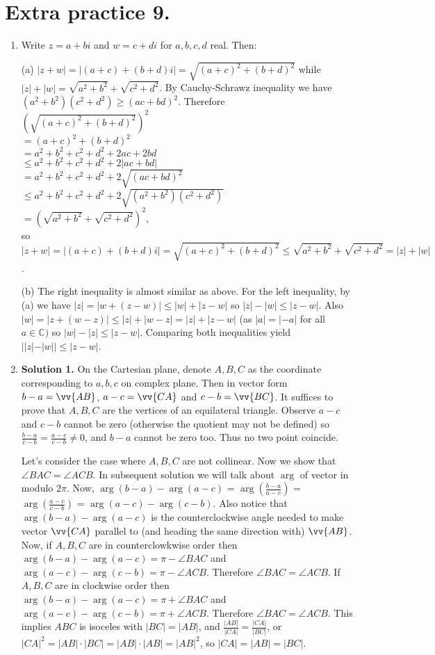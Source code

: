 \documentclass[11pt]{article}
\begin{document}
\section {Extra practice 9.}
\begin{enumerate}
\item Write $z=a+bi$ and $w=c+di$ for $a,b,c,d$ real. Then:

(a) $|z+w|=|(a+c)+(b+d)i|=\sqrt{(a+c)^2+(b+d)^2}$ while $|z|+|w|=\sqrt{a^2+b^2}+\sqrt{c^2+d^2}$. By Cauchy-Schrawz inequality we have $(a^2+b^2)(c^2+d^2)\ge (ac+bd)^2$. Therefore\\ 
$(\sqrt{(a+c)^2+(b+d)^2})^2$\\
$=(a+c)^2+(b+d)^2$\\
$=a^2+b^2+c^2+d^2+2ac+2bd$\\
$\le a^2+b^2+c^2+d^2+2|ac+bd|$\\
$= a^2+b^2+c^2+d^2+2\sqrt{(ac+bd)^2}$\\
$\le a^2+b^2+c^2+d^2+2\sqrt{(a^2+b^2)(c^2+d^2)}$\\
$=(\sqrt{a^2+b^2}+\sqrt{c^2+d^2})^2$,\\
so $|z+w|=|(a+c)+(b+d)i|=\sqrt{(a+c)^2+(b+d)^2}\le \sqrt{a^2+b^2}+\sqrt{c^2+d^2}=|z|+|w|$.

(b) The right inequality is almost similar as above. For the left inequality, by (a) we have $|z|=|w+(z-w)|\le |w|+|z-w|$ so $|z|-|w|\le |z-w|$. Also $|w|=|z+(w-z)|\le |z|+|w-z|=|z|+|z-w|$ (as $|a|=|-a|$ for all $a\in\mathbb{C})$ so $|w|-|z|\le |z-w|$. Comparing both inequalities yield $||z|-|w||\le |z-w|$.

\item\textbf{Solution 1.} On the Cartesian plane, denote $A, B, C$ as the coordinate corresponding to $a,b,c$ on complex plane. Then in vector form $b-a=\vv{AB}$, $a-c=\vv{CA}$ and $c-b=\vv{BC}$. It suffices to prove that $A, B, C$ are the vertices of an equilateral triangle. Observe $a-c$ and $c-b$ cannot be zero (otherwise the quotient may not be defined) so $\frac{b-a}{c-b}=\frac{a-c}{c-b}\neq 0$, and $b-a$ cannot be zero too. Thus no two point coincide.

Let's consider the case where $A,B,C$ are not collinear. Now we show that $\angle BAC=\angle ACB$. In subsequent solution we will talk about $\arg$ of vector in modulo $2\pi$. Now, $\arg (b-a)-\arg (a-c)$ = $\arg (\frac{b-a}{a-c})$ = $\arg (\frac{a-c}{c-b})$ = $\arg (a-c)-\arg (c-b)$. Also notice that $\arg (b-a)-\arg (a-c)$ is the counterclockwise angle needed to make vector $\vv{CA}$ parallel to (and heading the same direction with) $\vv{AB}$. Now, if $A,B,C$ are in counterclowkwise order then $\arg (b-a)-\arg (a-c)= \pi-\angle BAC$ and $\arg (a-c)-\arg (c-b)=\pi-\angle ACB$. Therefore $\angle BAC=\angle ACB$. If $A,B,C$ are in clockwise order then $\arg (b-a)-\arg (a-c)= \pi+\angle BAC$ and $\arg (a-c)-\arg (c-b)=\pi+\angle ACB$. Therefore $\angle BAC=\angle ACB$. This implies $ABC$ is isoceles with $|BC|=|AB|$, and $\frac{|AB|}{|CA|}=\frac{|CA|}{|BC|}$, or $|CA|^2=|AB|\cdot |BC|=|AB|\cdot |AB|=|AB|^2$, so $|CA|=|AB|=|BC|$. 


\end{enumerate}
\end{document}
